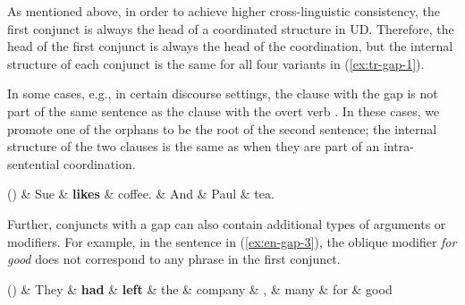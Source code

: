\documentclass[11pt]{article}
\newenvironment{myquote}%
  {\list{}{\leftmargin=0.0in\rightmargin=0.0in}\item[]}%
  {\endlist}
\newcounter{excounter}
\begin{document}
As mentioned above, in order to achieve higher cross-linguistic consistency, 
the first conjunct is always the head of a coordinated structure in UD. Therefore, 
the head of the first conjunct is always the head of the coordination, but the internal 
structure of each conjunct is the same for all four variants in (\ref{ex:tr-gap-1}).

In some cases, e.g., in certain discourse settings, the clause with the gap is not part 
of the same sentence as the clause with the overt verb \cite{Gerdes2015}. In these 
cases, we promote one of the orphans to be the root of the second sentence; the 
internal structure of the two clauses is the same as when they are part of an intra-sentential 
coordination.

\begin{myquote}
  \label{ex:en-gap-2}
  \footnotesize
  \begin{dependency}
    \begin{deptext}[column sep=0.3cm]
      (\theexcounter) \& Sue \& \textbf{likes} \& coffee. \& And \& Paul  \& tea. \\
    \end{deptext}
  \end{dependency}
\end{myquote}

Further, conjuncts with a gap can also contain additional types of arguments or modifiers. 
For example, in the sentence in (\ref{ex:en-gap-3}), the oblique modifier \textit{for good} 
does not correspond to any phrase in the first conjunct.

\begin{myquote}
  \label{ex:en-gap-3}
  \footnotesize
  \begin{dependency}[edge unit distance=2.0ex]
    \begin{deptext}[column sep=0.1cm]
     (\theexcounter) \& They \& \textbf{had} \& \textbf{left} \& the \& company \& , \& many \& for  \& good \\
    \end{deptext}
  \end{dependency}
  \end{myquote}
\end{document}
